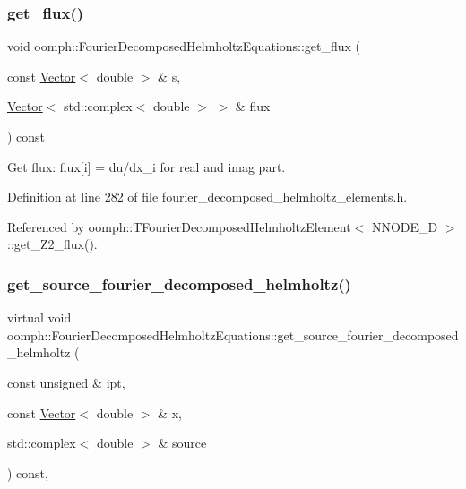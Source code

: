 \subsubsection{\texorpdfstring{get\+\_\+flux()}{get\_flux()}}
{\footnotesize\ttfamily void oomph\+::\+Fourier\+Decomposed\+Helmholtz\+Equations\+::get\+\_\+flux (\begin{DoxyParamCaption}\item[{const \hyperlink{classoomph_1_1Vector}{Vector}$<$ double $>$ \&}]{s,  }\item[{\hyperlink{classoomph_1_1Vector}{Vector}$<$ std\+::complex$<$ double $>$ $>$ \&}]{flux }\end{DoxyParamCaption}) const\hspace{0.3cm}{\ttfamily [inline]}}



Get flux\+: flux\mbox{[}i\mbox{]} = du/dx\+\_\+i for real and imag part. 



Definition at line 282 of file fourier\+\_\+decomposed\+\_\+helmholtz\+\_\+elements.\+h.



Referenced by oomph\+::\+T\+Fourier\+Decomposed\+Helmholtz\+Element$<$ N\+N\+O\+D\+E\+\_\+D $>$\+::get\+\_\+\+Z2\+\_\+flux().

\mbox{\label{classoomph_1_1FourierDecomposedHelmholtzEquations_af35f759fbed7364ef09250161dc32e93}} 
\subsubsection{\texorpdfstring{get\+\_\+source\+\_\+fourier\+\_\+decomposed\+\_\+helmholtz()}{get\_source\_fourier\_decomposed\_helmholtz()}}
{\footnotesize\ttfamily virtual void oomph\+::\+Fourier\+Decomposed\+Helmholtz\+Equations\+::get\+\_\+source\+\_\+fourier\+\_\+decomposed\+\_\+helmholtz (\begin{DoxyParamCaption}\item[{const unsigned \&}]{ipt,  }\item[{const \hyperlink{classoomph_1_1Vector}{Vector}$<$ double $>$ \&}]{x,  }\item[{std\+::complex$<$ double $>$ \&}]{source }\end{DoxyParamCaption}) const\hspace{0.3cm}{\ttfamily [inline]}, {\ttfamily [virtual]}}

